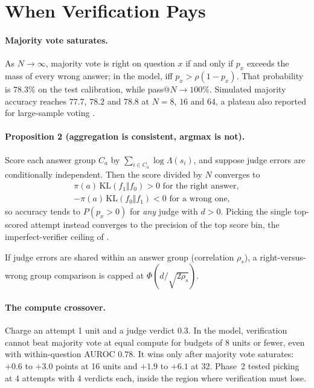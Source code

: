 \section{When Verification Pays}
\label{sec:scaling}

\paragraph{Majority vote saturates.}
As $N\to\infty$, majority vote is right on question $x$ if and only if $p_x$ exceeds the mass of every wrong answer;
in the model, iff $p_x>\rho(1-p_x)$. That probability is $78.3\%$ on the test calibration, while pass@$N\to100\%$.
Simulated majority accuracy reaches $77.7$, $78.2$ and $78.8$ at $N=8$, $16$ and $64$, a plateau also reported for
large-sample voting \citep{brown2024monkeys}.

\paragraph{Proposition 2 (aggregation is consistent, argmax is not).}
Score each answer group $C_a$ by $\sum_{i\in C_a}\log\Lambda(s_i)$, and suppose judge errors are conditionally
independent. Then the score divided by $N$ converges to
\[
\begin{gathered}
\pi(a)\,\mathrm{KL}(f_1\Vert f_0)>0 \text{ for the right answer},\\
-\pi(a)\,\mathrm{KL}(f_0\Vert f_1)<0 \text{ for a wrong one},
\end{gathered}
\]
so accuracy tends to $P(p_x>0)$ for \emph{any} judge with $d>0$. Picking the single top-scored attempt instead
converges to the precision of the top score bin, the imperfect-verifier ceiling of \citet{stroebl2026limits}.

If judge errors are shared within an answer group (correlation $\rho_s$), a right-versus-wrong group comparison is
capped at $\Phi(d/\sqrt{2\rho_s})$.

\paragraph{The compute crossover.}
Charge an attempt 1 unit and a judge verdict $0.3$. In the model, verification cannot beat majority vote at equal
compute for budgets of 8 units or fewer, even with within-question AUROC $0.78$. It wins only after majority vote
saturates: $+0.6$ to $+3.0$ points at 16 units and $+1.9$ to $+6.1$ at 32. Phase~2 tested picking at 4 attempts with
4 verdicts each, inside the region where verification must lose.

